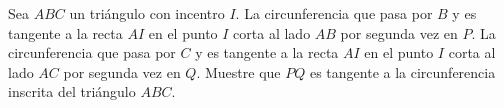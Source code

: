 Sea $ABC$ un triángulo con incentro $I$. La circunferencia que pasa por $B$ y es tangente
a la recta $AI$ en el punto $I$ corta al lado $AB$ por segunda vez en $P$. La circunferencia que pasa por $C$
y es tangente a la recta $AI$ en el punto $I$ corta al lado $AC$ por segunda vez en $Q$. Muestre que $PQ$ es
tangente a la circunferencia inscrita del triángulo $ABC$.